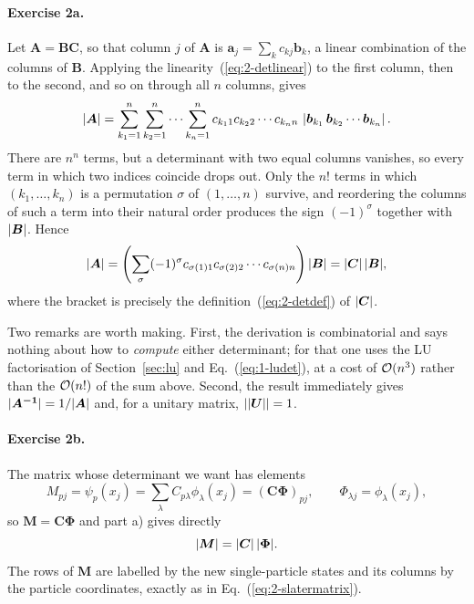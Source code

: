 \paragraph{Exercise 2a.}
Let $\bm{A}=\bm{B}\bm{C}$, so that column $j$ of $\bm{A}$ is
$\bm{a}_j=\sum_{k}c_{kj}\bm{b}_k$, a linear combination of the columns of
$\bm{B}$.  Applying the linearity~(\ref{eq:2-detlinear}) to the first column,
then to the second, and so on through all $n$ columns, gives
\begin{equation}
  {|\boldsymbol{A}|} = \sum_{k_1=1}^{n}\sum_{k_2=1}^{n}\cdots\sum_{k_n=1}^{n}
    c_{k_1 1}c_{k_2 2}\cdots c_{k_n n}\,
    \left|\bm{b}_{k_1}\,\bm{b}_{k_2}\cdots\bm{b}_{k_n}\right| .
  \label{eq:1-w34a2}
\end{equation}
There are $n^n$ terms, but a determinant with two equal columns vanishes, so
every term in which two indices coincide drops out.  Only the $n!$ terms in
which $(k_1,\dots,k_n)$ is a permutation $\sigma$ of $(1,\dots,n)$ survive,
and reordering the columns of such a term into their natural order produces
the sign $(-1)^{\sigma}$ together with ${|\boldsymbol{B}|}$.  Hence
\begin{equation}
  {|\boldsymbol{A}|} = \left(\sum_{\sigma}(-1)^{\sigma}
    c_{\sigma(1)1}c_{\sigma(2)2}\cdots c_{\sigma(n)n}\right){|\boldsymbol{B}|}
   = {|\boldsymbol{C}|}\,{|\boldsymbol{B}|},
  \label{eq:1-w34a3}
\end{equation}
where the bracket is precisely the definition~(\ref{eq:2-detdef}) of
${|\boldsymbol{C}|}$.

Two remarks are worth making.  First, the derivation is combinatorial and says
nothing about how to \emph{compute} either determinant; for that one uses the
LU factorisation of Section~\ref{sec:lu} and Eq.~(\ref{eq:1-ludet}), at a cost
of $\mathcal{O}(n^3)$ rather than the $\mathcal{O}(n!)$ of the sum above.  Second, the
result immediately gives ${|\boldsymbol{A^{-1}}|}=1/{|\boldsymbol{A}|}$ and, for a unitary matrix,
$|{|\boldsymbol{U}|}|=1$.

\paragraph{Exercise 2b.}
The matrix whose determinant we want has elements
\begin{equation}
  M_{pj} = \psi_p(x_j) = \sum_{\lambda}C_{p\lambda}\phi_{\lambda}(x_j)
         = \left(\bm{C}\bm{\Phi}\right)_{pj},
  \qquad \Phi_{\lambda j} = \phi_{\lambda}(x_j),
  \label{eq:1-w34b1}
\end{equation}
so $\bm{M}=\bm{C}\bm{\Phi}$ and part a) gives directly
\begin{equation}
  {|\boldsymbol{M}|} = {|\boldsymbol{C}|}\,{|\boldsymbol{\Phi}|} .
  \label{eq:1-w34b2}
\end{equation}
The rows of $\bm{M}$ are labelled by the new single-particle states and its
columns by the particle coordinates, exactly as in
Eq.~(\ref{eq:2-slatermatrix}).

